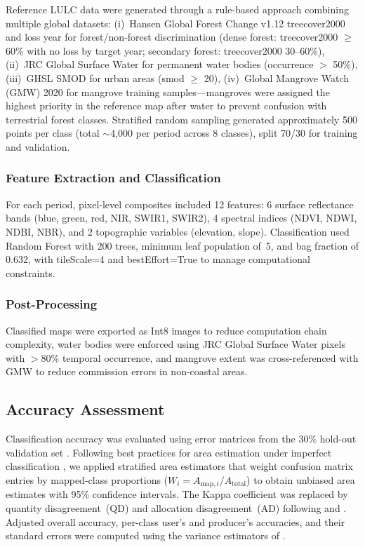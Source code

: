 \documentclass[12pt,a4paper]{article}
\begin{document}
Reference LULC data were generated through a rule-based approach combining multiple global datasets: (i)~Hansen Global Forest Change v1.12 treecover2000 and loss year for forest/non-forest discrimination (dense forest: treecover2000 $\geq$ 60\% with no loss by target year; secondary forest: treecover2000 30--60\%), (ii)~JRC Global Surface Water for permanent water bodies (occurrence $>$ 50\%), (iii)~GHSL SMOD for urban areas (smod $\geq$ 20), (iv)~Global Mangrove Watch (GMW) 2020 for mangrove training samples---mangroves were assigned the highest priority in the reference map after water to prevent confusion with terrestrial forest classes. Stratified random sampling generated approximately 500 points per class (total ${\sim}$4,000 per period across 8 classes), split 70/30 for training and validation.

\subsubsection{Feature Extraction and Classification}

For each period, pixel-level composites included 12 features: 6 surface reflectance bands (blue, green, red, NIR, SWIR1, SWIR2), 4 spectral indices (NDVI, NDWI, NDBI, NBR), and 2 topographic variables (elevation, slope). Classification used Random Forest \citep[\texttt{ee.Classifier.smileRandomForest};][]{Breiman2001} with 200 trees, minimum leaf population of~5, and bag fraction of 0.632, with tileScale=4 and bestEffort=True to manage computational constraints.

\subsubsection{Post-Processing}

Classified maps were exported as Int8 images to reduce computation chain complexity, water bodies were enforced using JRC Global Surface Water pixels with $>$80\% temporal occurrence, and mangrove extent was cross-referenced with GMW to reduce commission errors in non-coastal areas.

\subsection{Accuracy Assessment}

Classification accuracy was evaluated using error matrices from the 30\% hold-out validation set \citep{Congalton1991,Foody2002}. Following best practices for area estimation under imperfect classification \citep{Olofsson2014,Stehman2019}, we applied stratified area estimators that weight confusion matrix entries by mapped-class proportions ($W_i = A_{\text{map},i} / A_{\text{total}}$) to obtain unbiased area estimates with 95\% confidence intervals. The Kappa coefficient was replaced by quantity disagreement~(QD) and allocation disagreement~(AD) following \citet{Pontius2011} and \citet{Foody2020}. Adjusted overall accuracy, per-class user's and producer's accuracies, and their standard errors were computed using the variance estimators of \citet{Olofsson2014}.
\end{document}
